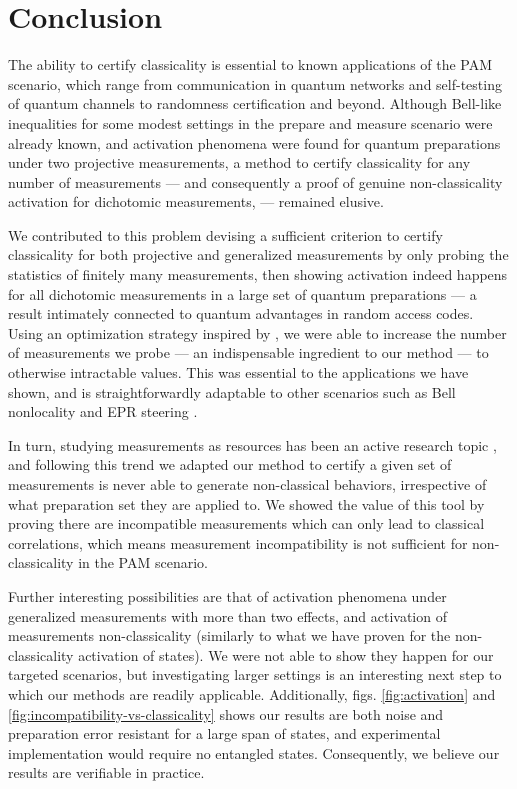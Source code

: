 \documentclass[a4paper,preprintnumbers,floatfix,superscriptaddress,pra,twocolumn,showpacs,notitlepage,longbibliography]{revtex4-2}
\begin{document}

    
\section{Conclusion}
    
    The ability to certify classicality is essential to known applications of the PAM scenario, which range from communication in quantum networks and self-testing of quantum channels to randomness certification and beyond. Although Bell-like inequalities for some modest settings in the prepare and measure scenario were already known, and activation phenomena were found for quantum preparations under two projective measurements, a method to certify classicality for any number of measurements --- and consequently a proof of genuine non-classicality activation for dichotomic measurements, --- remained elusive.
    
    We contributed to this problem devising a sufficient criterion to certify classicality for both projective and generalized measurements by only probing the statistics of finitely many measurements, then showing activation indeed happens for all dichotomic measurements in a large set of quantum preparations --- a result intimately connected to quantum advantages in random access codes. Using an optimization strategy inspired by \cite{fillettaz-algorithmic-2018}, we were able to increase the number of measurements we probe --- an indispensable ingredient to our method --- to otherwise intractable values. This was essential to the applications we have shown, and is straightforwardly adaptable to other scenarios such as Bell nonlocality and EPR steering \cite{cavalcanti-method-2016,hirsch-method-2016}.

   In turn, studying measurements as resources has been an active research topic \cite{Oszmaniec_2019, Buscemi-2020}, and following this trend we adapted our method to certify a given set of measurements is never able to generate non-classical behaviors, irrespective of what preparation set they are applied to. We showed the value of this tool by proving there are incompatible measurements which can only lead to classical correlations, which means measurement incompatibility is not sufficient for non-classicality in the PAM scenario.
    
    Further interesting possibilities are that of activation phenomena under generalized measurements with more than two effects, and activation of measurements non-classicality (similarly to what we have proven for the non-classicality activation of states). We were not able to show they happen for our targeted scenarios, but investigating larger settings is an interesting next step to which our methods are readily applicable. Additionally, figs. \ref{fig:activation} and \ref{fig:incompatibility-vs-classicality} shows our results are both noise and preparation error resistant for a large span of states, and experimental implementation would require no entangled states. Consequently, we believe our results are verifiable in practice.
    
\end{document}
